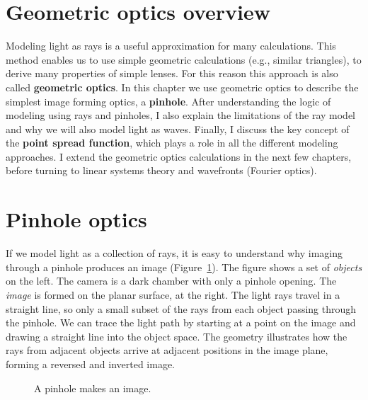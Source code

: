 \documentclass[
  letterpaper,
]{book}
\begin{document}
\section{Geometric optics overview}\label{geometric-optics-overview}

Modeling light as rays is a useful approximation for many calculations.
This method enables us to use simple geometric calculations (e.g.,
similar triangles), to derive many properties of simple lenses. For this
reason this approach is also called \textbf{geometric optics}. In this
chapter we use geometric optics to describe the simplest image forming
optics, a \textbf{pinhole}. After understanding the logic of modeling
using rays and pinholes, I also explain the limitations of the ray model
and why we will also model light as waves. Finally, I discuss the key
concept of the \textbf{point spread function}, which plays a role in all
the different modeling approaches. I extend the geometric optics
calculations in the next few chapters, before turning to linear systems
theory and wavefronts (Fourier optics).

\section{Pinhole optics}\label{pinhole-optics}

If we model light as a collection of rays, it is easy to understand why
imaging through a pinhole produces an image
(Figure~\ref{fig-pinhole-image}). The figure shows a set of
\emph{objects} on the left. The camera is a dark chamber with only a
pinhole opening. The \emph{image} is formed on the planar surface, at
the right. The light rays travel in a straight line, so only a small
subset of the rays from each object passing through the pinhole. We can
trace the light path by starting at a point on the image and drawing a
straight line into the object space. The geometry illustrates how the
rays from adjacent objects arrive at adjacent positions in the image
plane, forming a reversed and inverted image.

\begin{figure}


\caption{\label{fig-pinhole-image}A pinhole makes an image.}

\end{figure}%
\end{document}
